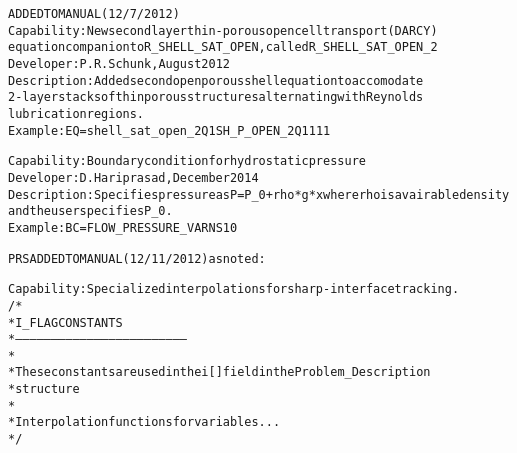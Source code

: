 \documentclass{article}
\begin{document}
\begin{alltt}
ADDED TO MANUAL (12/7/2012)
Capability:  New second layer thin-porous open cell transport (DARCY)
equation companion to R_SHELL_SAT_OPEN, called  R_SHELL_SAT_OPEN_2
Developer: P. R. Schunk, August 2012
Description:  Added second open porous shell equation to accomodate
2-layer stacks of thin porous structures alternating with Reynolds
lubrication regions. 
Example: EQ = shell_sat_open_2   Q1 SH_P_OPEN_2   Q1 1           1   1

Capability: Boundary condition for hydrostatic pressure
Developer: D. Hariprasad, December 2014
Description: Specifies pressure as P = P_0 + rho*g*x where rho is a vairable density and the user specifies P_0.
Example:  BC = FLOW_PRESSURE_VAR NS 1 0


PRS ADDED TO MANUAL (12/11/2012) as noted:

Capability:  Specialized interpolations for sharp-interface tracking. 
/*
 * I_FLAG CONSTANTS
 * ------------------------------------------------------------------------
 *
 * These constants are used in the i[] field in the Problem_Description
 * structure
 *
 * Interpolation functions for variables...
 */


\end{alltt}
\end{document}
